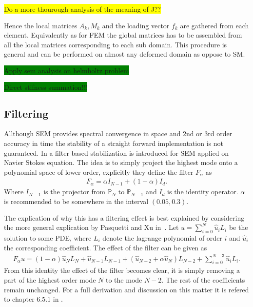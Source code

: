 \colorbox{yellow}{Do a more thourough analysis of the meaning of J??}

Hence the local matrices $A_k,M_k$ and the loading vector $f_k$ 
are gathered from each element.
Equivalently as for FEM the global matrices has to be assembled
from all the local matrices corresponding to each sub domain. This procedure is general and can 
be performed on almost any deformed domain as oppose to SM. 

\colorbox{green}{Apply sem analysis on helmholtz problem}


\colorbox{green}{Direct stifness summation!!!}


\subsection{Filtering}
Allthough SEM provides spectral convergence in space and 2nd or 3rd order accuracy in time the stability of a straight forward
implementation is not guaranteed. In \cite{FischerMullen} a filter-based stabilization is introduced for SEM applied on 
Navier Stokes equation. The idea is to simply project the highest mode onto a polynomial space of lower order, 
explicitly they define the filter $F_{\alpha}$ as 
%
\begin{align}
    F_{\alpha}= \alpha I_{N-1}  + (1-\alpha) I_d.
    \label{eq:filter}
\end{align}
%
Where $I_{N-1}$ is the projector from $\mathbb{P}_N$ to $\mathbb{P}_{N-1}$ and $ I_d$ is the identity operator.
$\alpha$ is recommended to be somewhere in the interval $(0.05,0.3)$.

The explication of why this has a filtering effect is best explained by considering the 
more general explication by Pasquetti and Xu in~\cite{Pasquetti}. 
Let $u = \sum_{i=0}^{N} \hat{u}_i L_i$ be the solution to some PDE, where $L_i$ denote the lagrange
polynomial of order $i$ and $\hat{u}_i$ the corresponding coefficient. The effect of the filter
can be given as 
%
\begin{align}
    F_{\alpha} u = 
    (1-\alpha)\hat{u}_{N}L_{N}
    +\hat{u}_{N-1}L_{N-1} +
    (\hat{u}_{N-2}+\alpha \hat{u}_{N})L_{N-2}
    +\sum_{i=0}^{N-3}\hat{u}_{i}L_{i}.
    \label{eq:filtereffect}
\end{align}
%
From this identity the effect of the filter becomes clear, it is simply removing a part of 
the highest order mode $N$ to the mode $N-2$. The rest of the coefficients remain unchanged.
For a full derivation and discussion on this matter it is refered to chapter 6.5.1 in 
\cite{Karniadakis}.

